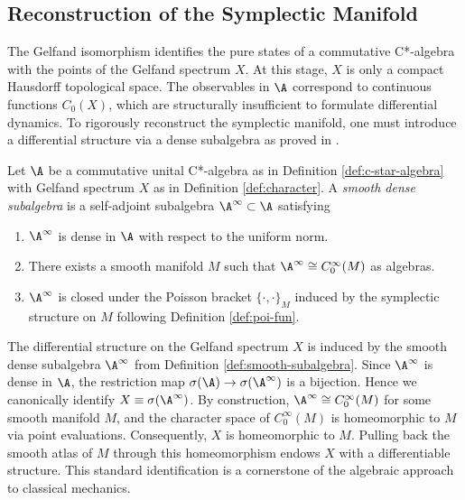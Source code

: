 \subsection*{Reconstruction of the Symplectic Manifold}

The Gelfand isomorphism identifies the pure states of a commutative C*-algebra with the points of the Gelfand spectrum \(X\). At this stage, \(X\) is only a compact Hausdorff topological space. The observables in \(\A\) correspond to continuous functions \(C_0(X)\), which are structurally insufficient to formulate differential dynamics. To rigorously reconstruct the symplectic manifold, one must introduce a differential structure via a dense subalgebra as proved in \cite{landsmanMathematicalTopicsClassical1998}.

\begin{definition}\label{def:smooth-subalgebra}
	Let \(\A\) be a commutative unital C*-algebra as in Definition \ref{def:c-star-algebra} with Gelfand spectrum \(X\) as in Definition \ref{def:character}. A \emph{smooth dense subalgebra} is a self-adjoint subalgebra \(\A^\infty \subset \A\) satisfying
	\begin{enumerate}
		\item \(\A^\infty\) is dense in \(\A\) with respect to the uniform norm.
		\item There exists a smooth manifold \(M\) such that \(\A^\infty \cong C^\infty_0(M)\) as algebras.
		\item \(\A^\infty\) is closed under the Poisson bracket \(\{\cdot,\cdot\}_M\) induced by the symplectic structure on \(M\) following Definition \ref{def:poi-fun}.
	\end{enumerate}
\end{definition}

The differential structure on the Gelfand spectrum \(X\) is induced by the smooth dense subalgebra \(\A^\infty\) from Definition \ref{def:smooth-subalgebra}. Since \(\A^\infty\) is dense in \(\A\), the restriction map \(\sigma(\A) \to \sigma(\A^\infty)\) is a bijection. Hence we canonically identify \(X \equiv \sigma(\A^\infty)\). By construction, \(\A^\infty \cong C_0^\infty(M)\) for some smooth manifold \(M\), and the character space of \(C_0^\infty(M)\) is homeomorphic to \(M\) via point evaluations. Consequently, \(X\) is homeomorphic to \(M\). Pulling back the smooth atlas of \(M\) through this homeomorphism endows \(X\) with a differentiable structure. This standard identification is a cornerstone of the algebraic approach to classical mechanics.

